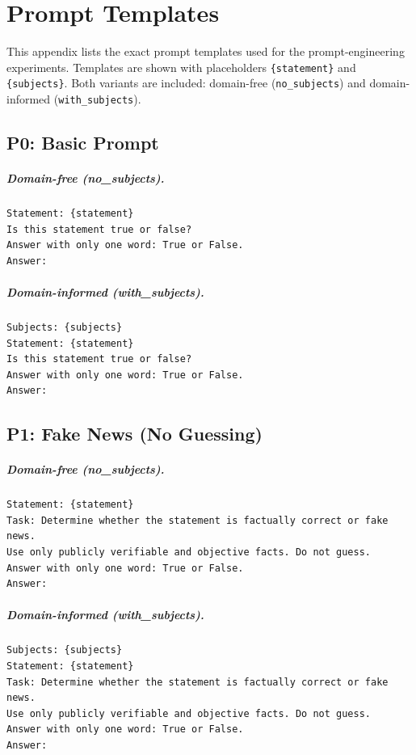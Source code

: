 \chapter{Prompt Templates}
\label{app:prompts}

This appendix lists the exact prompt templates used for the prompt-engineering experiments.
Templates are shown with placeholders \texttt{\{statement\}} and \texttt{\{subjects\}}.
Both variants are included: domain-free (\texttt{no\_subjects}) and domain-informed (\texttt{with\_subjects}).

\section{P0: Basic Prompt}
\paragraph{Domain-free (no\_subjects).}
\begin{verbatim}
Statement: {statement}
Is this statement true or false?
Answer with only one word: True or False.
Answer:
\end{verbatim}

\paragraph{Domain-informed (with\_subjects).}
\begin{verbatim}
Subjects: {subjects}
Statement: {statement}
Is this statement true or false?
Answer with only one word: True or False.
Answer:
\end{verbatim}

\section{P1: Fake News (No Guessing)}
\paragraph{Domain-free (no\_subjects).}
\begin{verbatim}
Statement: {statement}
Task: Determine whether the statement is factually correct or fake news. 
Use only publicly verifiable and objective facts. Do not guess.
Answer with only one word: True or False.
Answer:
\end{verbatim}

\paragraph{Domain-informed (with\_subjects).}
\begin{verbatim}
Subjects: {subjects}
Statement: {statement}
Task: Determine whether the statement is factually correct or fake news. 
Use only publicly verifiable and objective facts. Do not guess.
Answer with only one word: True or False.
Answer:
\end{verbatim}

